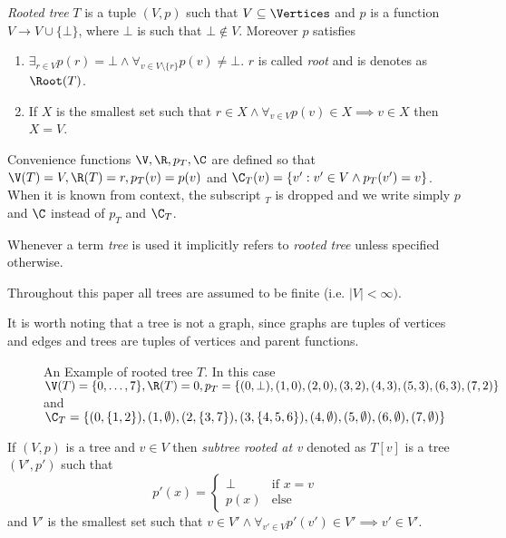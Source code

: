 \begin{defi}
    \emph{Rooted tree} $T$ is a tuple $(V, p)$ such that $V \subseteq \Vertices$ and $p$ is a function $V \to V \cup \{\bot\}$, where $\bot$ is such that $\bot \not\in V$. Moreover $p$ satisfies
    \begin{enumerate}
        \item $\exists_{r \in V} p(r) = \bot \land \forall_{v \in V\setminus\{r\}} p(v) \neq \bot$. $r$ is called \emph{root} and is denotes as $\Root(T)$.
        \item If $X$ is the smallest set such that $r \in X \land \forall_{v \in V} p(v) \in X \implies v \in X$ then $X = V$.
    \end{enumerate}
    Convenience functions $\V, \R, p_T, \C$ are defined so that $\V(T) = V, \R(T) = r, p_T(v) = p(v)$ and $\C_T(v) = \{v' : v' \in V \land p_T(v') = v\}$. When it is known from context, the subscript $_T$ is dropped and we write simply $p$ and $\C$ instead of $p_T$ and $\C_T$.
\end{defi}

Whenever a term \emph{tree} is used it implicitly refers to \emph{rooted tree} unless specified otherwise.

Throughout this paper all trees are assumed to be finite (i.e. $|V| < \infty)$.

It is worth noting that a tree is not a graph, since graphs are tuples of vertices and edges and trees are tuples of vertices and parent functions.

\begin{figure}[h]
    \centering
    \caption{An Example of rooted tree $T$. In this case $\V(T) = \{0,\ldots,7\}, \R(T) = 0, p_T = \{(0, \bot), (1,0), (2,0), (3,2), (4,3), (5,3), (6,3), (7,2)\}$ and $\C_T = \{(0,\{1,2\}), (1,\emptyset), (2,\{3,7\}), (3,\{4,5,6\}), (4, \emptyset), (5, \emptyset), (6, \emptyset), (7, \emptyset)\}$}
\end{figure}

\begin{defi}
    If $(V,p)$ is a tree and $v \in V$ then \emph{subtree rooted at v} denoted as $T[v]$ is a tree $(V', p')$ such that
    \[
        p'(x) = \begin{cases}
            \bot & \text{if } x = v \\
            p(x) & \text{else}
        \end{cases}
    \]
    and $V'$ is the smallest set such that $v \in V' \land \forall_{v' \in V} p'(v') \in V' \implies v' \in V'$.
\end{defi}

